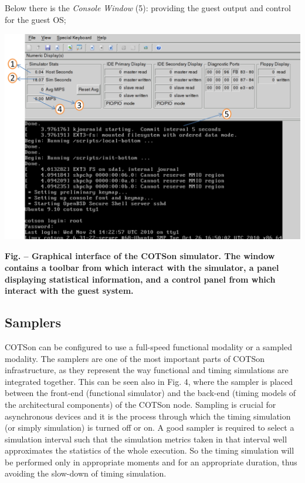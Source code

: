 \documentclass[a4paper]{article}
\newcounter{Figure}
\renewcommand\theFigure{\arabic{Figure}}
\begin{document}
\bigskip

{
Below there is the \textit{Console Window} (5): providing the guest
output and control for the guest OS;}

{\centering 
\includegraphics[width=5.2453in,height=3.652in]{img5.png}
\par}

{\centering{}\sffamily\bfseries
\label{bkm:Ref388170369}Fig.
\stepcounter{Figure}{\theFigure} -- Graphical interface of the COTSon
simulator. The window contains a toolbar from which interact with the
simulator, a panel displaying statistical information, and a control
panel from which interact with the guest system.
\par}

\subsection[Samplers]{Samplers}
{
COTSon can be configured to use a full-speed functional modality or a
sampled modality. The samplers are one of the most important parts of
COTSon infrastructure, as they represent the way functional and timing
simulations are integrated together. This can be seen also in Fig. 4,
where the sampler is placed between the front-end (functional
simulator) and the back-end (timing models of the architectural
components) of the COTSon node. Sampling is crucial for asynchronous
devices and it is the process through which the timing simulation (or
simply simulation) is turned off or on. A good sampler is required to
select a simulation interval such that the simulation metrics taken in
that interval well approximates the statistics of the whole execution.
So the timing simulation will be performed only in appropriate moments
and for an appropriate duration, thus avoiding the slow-down of timing
simulation.}
\end{document}
